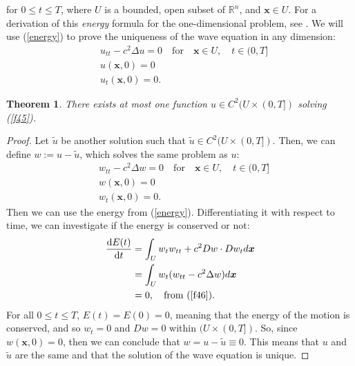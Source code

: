 \documentclass[a4paper, 12pt]{article}
\numberwithin{equation}{section}
\begin{document}
for $0 \le t \le T$, where $U$ is a bounded, open subset of $\mathbb{R}^n$, and
$\boldsymbol{x} \in U$. For a derivation of this \emph{energy} formula for the
one-dimensional problem, see \cite[Ch. 3.6.4]{Kev}. We will use
(\ref{energy}) to prove the uniqueness of the wave equation in any dimension:
\begin{equation} \label{f45}
    \begin{aligned}
        &u_{tt}-c^2\Delta u =0 \quad \textrm{for} \quad \boldsymbol{x} \in U, \quad t \in (0,T]\\
        &u(\boldsymbol{x}, 0)=0\\
        &u_t(\boldsymbol{x}, 0)=0.
    \end{aligned}
\end{equation}

\newtheorem*{theorem}{Theorem}
\begin{theorem}
    There exists at most one function $u \in C^2(U \times (0,T])$ solving
    (\ref{f45}).
\end{theorem}

\begin{proof}
    Let $\tilde{u}$ be another solution such that $\tilde{u} \in C^2(U \times
    (0,T])$. Then, we can define $w:=u-\tilde{u}$, which solves the same problem
    as $u$:
    \begin{equation} \label{f46}
        \begin{aligned}
            &w_{tt}-c^2\Delta w =0 \quad \textrm{for} \quad \boldsymbol{x} \in U, \quad t \in (0,T]\\
            &w(\boldsymbol{x}, 0)=0\\
            &w_t(\boldsymbol{x}, 0)=0.
        \end{aligned}
    \end{equation}
    Then we can use the energy from (\ref{energy}). Differentiating it with respect
    to time, we can investigate if the energy is conserved or not:
    \begin{equation*}
        \begin{aligned}
            \diff{E(t)}{t}&=\int_U w_t w_{tt} + c^2 Dw \cdot Dw_t d\boldsymbol{x}\\
            &=\int_U w_t (w_{tt}-c^2 \Delta w)d\boldsymbol{x}\\
            &=0, \quad \textrm{from (\ref{f46})}.
        \end{aligned}
    \end{equation*}
    For all $0 \le t \le T$, $E(t)=E(0)=0$, meaning that the energy of the
    motion is conserved,  and so $w_t=0$ and $Dw=0$ within $(U \times (0, T])$.
    So, since $w(\boldsymbol{x}, 0)=0$, then we can conclude that
    $w=u-\tilde{u}\equiv 0$. This means that $u$ and $\tilde{u}$ are the same
    and that the solution of the wave equation is unique.
\renewcommand\qedsymbol{q.e.d.}
\end{proof}
\end{document}
